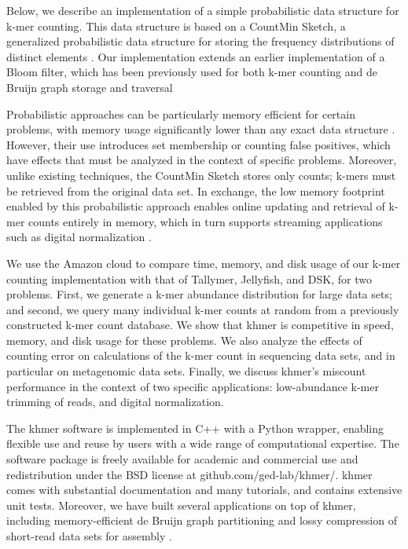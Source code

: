 \documentclass[10pt]{article}
\begin{document}

Below, we describe an implementation of a simple probabilistic data
structure for k-mer counting. This data structure is based on a
CountMin Sketch, a generalized probabilistic data structure for
storing the frequency distributions of distinct elements
\cite{Cormode2005}.  Our implementation extends an earlier
implementation of a Bloom filter, which has been previously used for
both k-mer counting and de Bruijn graph storage and traversal
\cite{Bloom70,BroderM03,Melsted2011,Pell2012,Rizk2013,Jones:2012aa}

Probabilistic approaches can be particularly memory efficient for
certain problems, with memory usage significantly lower than any exact
data structure \cite{Pell2012}.  However, their use introduces set
membership or counting false positives, which have effects that must
be analyzed in the context of specific problems.  Moreover, unlike
existing techniques, the CountMin Sketch stores only counts; k-mers
must be retrieved from the original data set.  In exchange, the low
memory footprint enabled by this probabilistic approach enables online
updating and retrieval of k-mer counts entirely in memory, which in
turn supports streaming applications such as digital normalization
\cite{Brown2012}.

We use the Amazon cloud to compare time, memory, and disk usage of our
k-mer counting implementation with that of Tallymer, Jellyfish, and
DSK, for two problems. First, we generate a k-mer abundance
distribution for large data sets; and second, we query many individual
k-mer counts at random from a previously constructed k-mer count
database.  We show that khmer is competitive in speed, memory, and
disk usage for these problems.  We also analyze the effects of
counting error on calculations of the k-mer count in sequencing data
sets, and in particular on metagenomic data sets.  Finally, we discuss
khmer's miscount performance in the context of two specific
applications: low-abundance k-mer trimming of reads, and digital
normalization.

The khmer software \cite{khmer} is implemented in C++ with a Python
wrapper, enabling flexible use and reuse by users with a wide range of
computational expertise.  The software package is freely available for
academic and commercial use and redistribution under the BSD license
at github.com/ged-lab/khmer/.  khmer comes with substantial
documentation and many tutorials, and contains extensive unit tests.
Moreover, we have built several applications on top of khmer,
including memory-efficient de Bruijn graph partitioning
\cite{Pell2012} and lossy compression of short-read data sets for
assembly \cite{Brown2012}.
\end{document}
